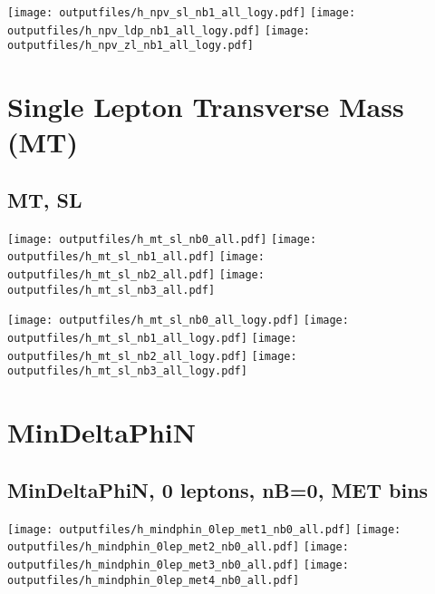 \documentclass[11pt]{article}
\begin{document}
     \texttt{[image: outputfiles/h\_npv\_sl\_nb1\_all\_logy.pdf]}
     \texttt{[image: outputfiles/h\_npv\_ldp\_nb1\_all\_logy.pdf]}
     \texttt{[image: outputfiles/h\_npv\_zl\_nb1\_all\_logy.pdf]}



    \section{Single Lepton Transverse Mass (MT)}


    \subsection{ MT, SL }

    \noindent
     \texttt{[image: outputfiles/h\_mt\_sl\_nb0\_all.pdf]}
     \texttt{[image: outputfiles/h\_mt\_sl\_nb1\_all.pdf]}
     \texttt{[image: outputfiles/h\_mt\_sl\_nb2\_all.pdf]}
     \texttt{[image: outputfiles/h\_mt\_sl\_nb3\_all.pdf]}

    \noindent
     \texttt{[image: outputfiles/h\_mt\_sl\_nb0\_all\_logy.pdf]}
     \texttt{[image: outputfiles/h\_mt\_sl\_nb1\_all\_logy.pdf]}
     \texttt{[image: outputfiles/h\_mt\_sl\_nb2\_all\_logy.pdf]}
     \texttt{[image: outputfiles/h\_mt\_sl\_nb3\_all\_logy.pdf]}

    \clearpage






    \section{ MinDeltaPhiN }

    \subsection{ MinDeltaPhiN, 0 leptons, nB=0, MET bins }

    \noindent
     \texttt{[image: outputfiles/h\_mindphin\_0lep\_met1\_nb0\_all.pdf]}
     \texttt{[image: outputfiles/h\_mindphin\_0lep\_met2\_nb0\_all.pdf]}
     \texttt{[image: outputfiles/h\_mindphin\_0lep\_met3\_nb0\_all.pdf]}
     \texttt{[image: outputfiles/h\_mindphin\_0lep\_met4\_nb0\_all.pdf]}
\end{document}
